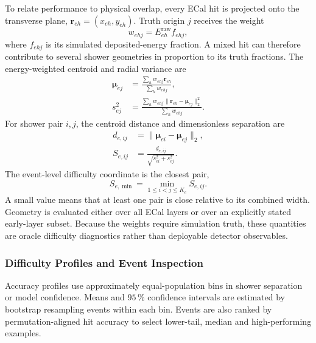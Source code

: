 To relate performance to physical overlap, every ECal hit is projected onto
the transverse plane, \(\boldsymbol r_{eh}=(x_{eh},y_{eh})\). Truth origin
\(j\) receives the weight
\begin{equation}
    w_{ehj}=E_{eh}^{\mathrm{raw}}f_{ehj},
    \label{eq:shower_geometry_weight}
\end{equation}
where \(f_{ehj}\) is its simulated deposited-energy fraction. A mixed hit can
therefore contribute to several shower geometries in proportion to its truth
fractions. The energy-weighted centroid and radial variance are
\begin{align}
    \boldsymbol{\mu}_{ej}
    &=
    \frac{\sum_h w_{ehj}\boldsymbol r_{eh}}
         {\sum_h w_{ehj}},
    \label{eq:projected_shower_centroid} \\
    s_{ej}^{2}
    &=
    \frac{\sum_h w_{ehj}
    \lVert\boldsymbol r_{eh}-\boldsymbol\mu_{ej}\rVert_2^2}
         {\sum_h w_{ehj}}.
         \label{eq:projected_shower_width}
\end{align}
For shower pair \(i,j\), the centroid distance and dimensionless separation
are
\begin{align}
    d_{e,ij}
    &=
    \lVert\boldsymbol\mu_{ei}-\boldsymbol\mu_{ej}\rVert_2,
    \label{eq:shower_centroid_distance} \\
    S_{e,ij}
    &=
    \frac{d_{e,ij}}{\sqrt{s_{ei}^{2}+s_{ej}^{2}}}.
    \label{eq:normalised_shower_separation}
\end{align}
The event-level difficulty coordinate is the closest pair,
\begin{equation}
     S_{e,\min}=\min_{1\leq i<j\leq K_e}S_{e,ij}.
    \label{eq:min_shower_separation}
\end{equation}
A small value means that at least one pair is close relative to its combined
width. Geometry is evaluated either over all ECal layers or over an explicitly
stated early-layer subset. Because the weights require simulation truth, these
quantities are oracle difficulty diagnostics rather than deployable detector
observables.

\subsubsection{Difficulty Profiles and Event Inspection}

Accuracy profiles use approximately equal-population bins in shower
separation or model confidence. Means and \(95\,\%\) confidence intervals are
estimated by bootstrap resampling events within each bin. Events are also
ranked by permutation-aligned hit accuracy to select lower-tail, median and
high-performing examples.

